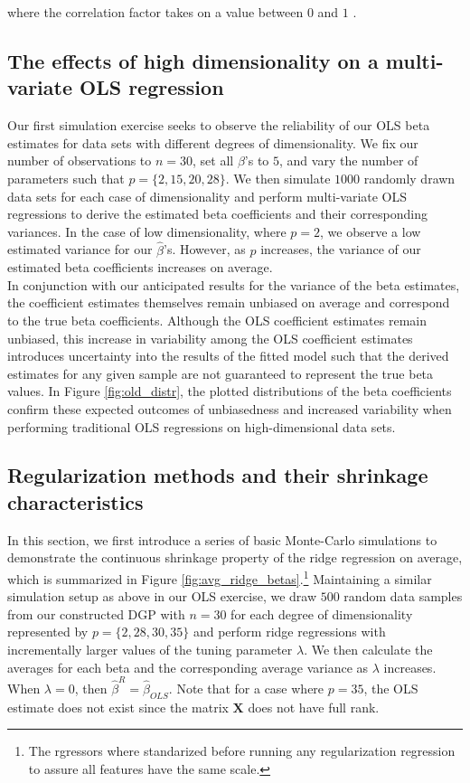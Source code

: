 \noindent where the correlation factor takes on a value between $0$ and $1$ \citep{zou2005regularization}.

\subsection{The effects of high dimensionality on a multi-variate OLS regression}

\noindent Our first simulation exercise seeks to observe the reliability of our OLS beta estimates for data sets with different degrees of dimensionality. We fix our number of observations to $n = 30$, set all $\beta$'s to $5$, and vary the number of parameters such that $p = \{2, 15, 20, 28\}$. We then simulate $1000$ randomly drawn data sets for each case of dimensionality and perform multi-variate OLS regressions to derive the estimated beta coefficients and their corresponding variances. In the case of low dimensionality, where $p = 2$, we observe a low estimated variance for our $\hat{\beta}$'s. However, as $p$ increases, the variance of our estimated beta coefficients increases on average. \\

\noindent In conjunction with our anticipated results for the variance of the beta estimates, the coefficient estimates themselves remain unbiased on average and correspond to the true beta coefficients. Although the OLS coefficient estimates remain unbiased, this increase in variability among the OLS coefficient estimates introduces uncertainty into the results of the fitted model such that the derived estimates for any given sample are not guaranteed to represent the true beta values. In Figure \ref{fig:old_distr}, the plotted distributions of the beta coefficients confirm these expected outcomes of unbiasedness and increased variability when performing traditional OLS regressions on high-dimensional data sets.

\subsection{Regularization methods and their shrinkage characteristics}

\noindent In this section, we first introduce a series of basic Monte-Carlo simulations to demonstrate the continuous shrinkage property of the ridge regression on average, which is summarized in Figure \ref{fig:avg_ridge_betas}.\footnote{The rgressors where standarized before running any regularization regression to assure all features have the same scale.} Maintaining a similar simulation setup as above in our OLS exercise, we draw $500$ random data samples from our constructed DGP with $n=30$ for each degree of dimensionality represented by $p = \{2, 28, 30, 35\}$ and perform ridge regressions with incrementally larger values of the tuning parameter $\lambda$. We then calculate the averages for each beta and the corresponding average variance as $\lambda$ increases. When $\lambda = 0$, then $\hat{\beta}^R = \hat{\beta}_{OLS}$. Note that for a case where $p=35$, the OLS estimate does not exist since the matrix $\mathbf{X}$ does not have full rank. \\

